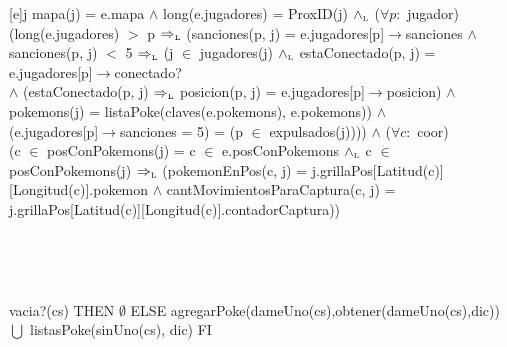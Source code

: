 \begin{Representacion}


	\tadAxioma{}
	

	{j}{
		mapa(j) = e.mapa $\land$ long(e.jugadores) = ProxID(j) $\land_{\mathrm{\scriptscriptstyle{L}}}$ ($\forall p:$ jugador) \\
		(long(e.jugadores) $>$ p $\Rightarrow_{\mathrm{\scriptscriptstyle{L}}}$ (sanciones(p, j) = e.jugadores[p]$\rightarrow$sanciones $\land$ \\
		sanciones(p, j) $<$ 5 $\Rightarrow_{\mathrm{\scriptscriptstyle{L}}}$ (j $\in$ jugadores(j) $\land_{\mathrm{\scriptscriptstyle{L}}}$ estaConectado(p, j) = e.jugadores[p]$\rightarrow$conectado? \\
		$\land$ (estaConectado(p, j) $\Rightarrow_{\mathrm{\scriptscriptstyle{L}}}$ posicion(p, j) = e.jugadores[p]$\rightarrow$posicion) $\land$ \\
		pokemons(j) = listaPoke(claves(e.pokemons), e.pokemons)) $\land$ \\
		(e.jugadores[p]$\rightarrow$sanciones = 5) = (p $\in$ expulsados(j)))) $\land$ ($\forall c:$ coor) \\
		(c $\in$ posConPokemons(j) = c $\in$ e.posConPokemons $\land_{\mathrm{\scriptscriptstyle{L}}}$ c $\in$ posConPokemons(j) $\Rightarrow_{\mathrm{\scriptscriptstyle{L}}}$ (pokemonEnPos(c, j) = j.grillaPos[Latitud(c)][Longitud(c)].pokemon $\land$ cantMovimientosParaCaptura(c, j) = j.grillaPos[Latitud(c)][Longitud(c)].contadorCaptura))
	}
	
	~

		 
	~

	{\IF vacia?(cs) THEN
		$\emptyset$
	ELSE
		agregarPoke(dameUno(cs),obtener(dameUno(cs),dic)) $\bigcup$ listasPoke(sinUno(cs), dic)
	FI}
		

\end{Representacion}
